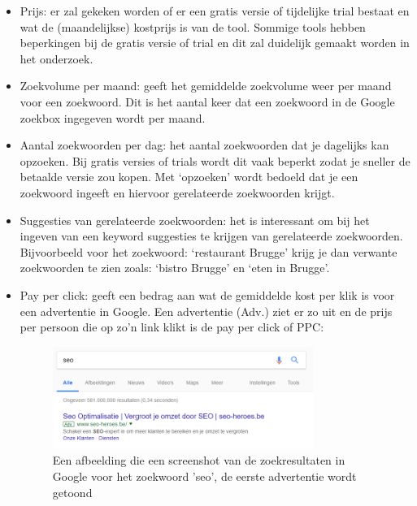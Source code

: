 \begin{itemize}
\item Prijs: er zal gekeken worden of er een gratis versie of tijdelijke trial bestaat en wat de (maandelijkse) kostprijs is van de tool. Sommige tools hebben beperkingen bij de gratis versie of trial en dit zal duidelijk gemaakt worden in het onderzoek. 
\item Zoekvolume per maand: geeft het gemiddelde zoekvolume weer per maand voor een zoekwoord. Dit is het aantal keer dat een zoekwoord in de Google zoekbox ingegeven wordt per maand.
\item Aantal zoekwoorden per dag: het aantal zoekwoorden dat je dagelijks kan opzoeken. Bij gratis versies of trials wordt dit vaak beperkt zodat je sneller de betaalde versie zou kopen. Met ‘opzoeken’ wordt bedoeld dat je een zoekwoord ingeeft en hiervoor gerelateerde zoekwoorden krijgt.
\item Suggesties van gerelateerde zoekwoorden: het is interessant om bij het ingeven van een keyword suggesties te krijgen van gerelateerde zoekwoorden. Bijvoorbeeld voor het zoekwoord: ‘restaurant Brugge’ krijg je dan verwante zoekwoorden te zien zoals: ‘bistro Brugge’ en ‘eten in Brugge’.
\item Pay per click: geeft een bedrag aan wat de gemiddelde kost per klik is voor een advertentie in Google. Een advertentie (Adv.) ziet er zo uit en de prijs per persoon die op zo’n link klikt is de pay per click of PPC: 

\begin{figure}[h!]
\centering
\includegraphics[width=0.8\textwidth]{img/Adwordsvoorbeeld.png}
\caption{Een afbeelding die een screenshot van de zoekresultaten in Google voor het zoekwoord 'seo', de eerste advertentie wordt getoond \autocite{google.be}}
\end{figure}


\end{itemize}

